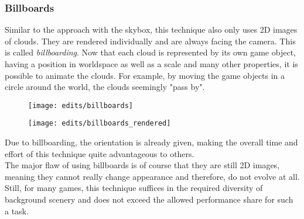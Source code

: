 \subsubsection{Billboards}
Similar to the approach with the skybox, this technique also only uses 2D images of clouds. They are rendered individually and are always facing the camera. This is called \textit{\gls{billboard}ing}.
Now that each cloud is represented by its own game object, having a position in \gls{worldspace} as well as a scale and many other properties, it is possible to animate the clouds. For example, by moving the game objects in a circle around the world, the clouds seemingly "pass by".
\begin{figure}[H]
    \centering
        \begin{minipage}{0.48\linewidth}
            \texttt{[image: edits/billboards]}
            \label{img:edits:billboards}
        \end{minipage}
    \hfill
        \begin{minipage}{0.45\linewidth}
            \texttt{[image: edits/billboards\_rendered]}
            \label{img:edits:billboards_rendered}
        \end{minipage}
\end{figure}
\noindent
Due to billboarding, the orientation is already given, making the overall time and effort of this technique quite advantageous to others.
\\
The major flaw of using billboards is of course that they are still 2D images, meaning they cannot really change appearance and therefore, do not evolve at all. 
Still, for many games, this technique suffices in the required diversity of background scenery and does not exceed the allowed performance share for such a task.

